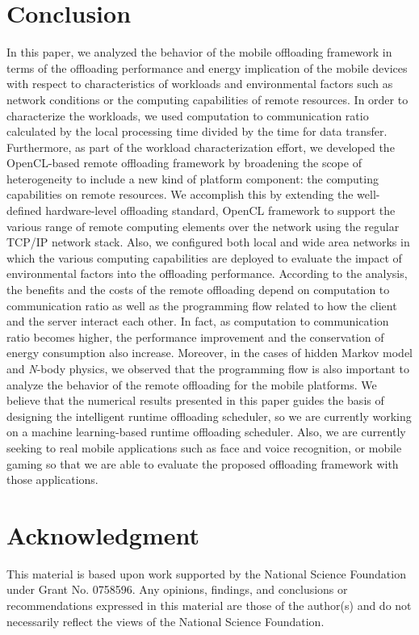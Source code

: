 \documentclass[conference]{IEEEtran}
\begin{document}
\section{Conclusion}
In this paper, we analyzed the behavior of the mobile offloading
framework in terms of the offloading performance and energy implication
of the mobile devices with respect to characteristics of workloads and
environmental factors such as network conditions or the computing
capabilities of remote resources.
%
In order to characterize the workloads, we used computation to
communication ratio calculated by the local processing time divided by
the time for data transfer.
%
Furthermore, as part of the workload characterization effort, we
developed the OpenCL-based remote offloading framework by broadening the
scope of heterogeneity to include a new kind of platform component: the
computing capabilities on remote resources. 
%
We accomplish this by extending the well-defined hardware-level
offloading standard, OpenCL framework to support the various range of
remote computing elements over the network using the regular TCP/IP
network stack.
%
Also, we configured both local and wide area networks in which the
various computing capabilities are deployed to evaluate the impact of
environmental factors into the offloading performance.
%
According to the analysis, the benefits and the costs of the remote
offloading depend on computation to communication ratio as well as the
programming flow related to how the client and the server interact each
other.
%
In fact, as computation to communication ratio becomes higher, 
the performance improvement and the conservation of energy consumption 
also increase.
%
Moreover, in the cases of hidden Markov model and \textit{N}-body
physics, we observed that the programming flow is also important to
analyze the behavior of the remote offloading for the mobile
platforms.  
%
We believe that the numerical results presented in this paper guides the basis
of designing the intelligent runtime offloading scheduler, so we are
currently working on a machine learning-based runtime offloading scheduler.
%
Also, we are currently seeking to real mobile applications such as face and
voice recognition, or mobile gaming so that we are able to 
evaluate the proposed offloading framework with those
applications.
%
\section*{Acknowledgment}
This material is based upon work supported by the National Science
Foundation under Grant No. 0758596.
%
Any opinions, findings, and conclusions or recommendations expressed in
this material are those of the author(s) and do not necessarily reflect
the views of the National Science Foundation.
%





\end{document}
